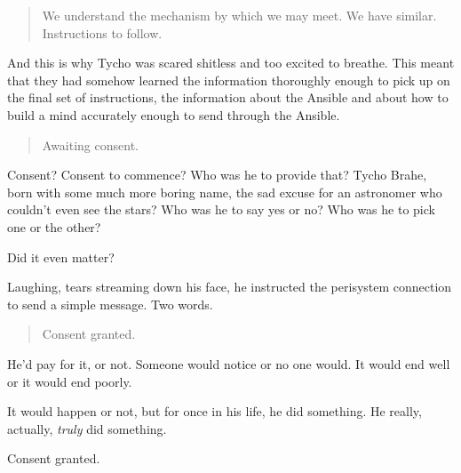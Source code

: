 \begin{quote}
We understand the mechanism by which we may meet. We have similar. Instructions to follow.
\end{quote}

\noindent And this is why Tycho was scared shitless and too excited to breathe. This meant that they had somehow learned the information thoroughly enough to pick up on the final set of instructions, the information about the Ansible and about how to build a mind accurately enough to send through the Ansible.

\begin{quote}
Awaiting consent.
\end{quote}

\noindent Consent? Consent to commence? Who was he to provide that? Tycho Brahe, born with some much more boring name, the sad excuse for an astronomer who couldn't even see the stars? Who was he to say yes or no? Who was he to pick one or the other?

Did it even matter?

Laughing, tears streaming down his face, he instructed the perisystem connection to send a simple message. Two words.

\begin{quote}
Consent granted.
\end{quote}

\noindent He'd pay for it, or not. Someone would notice or no one would. It would end well or it would end poorly.

It would happen or not, but for once in his life, he did something. He really, actually, \emph{truly} did something.

Consent granted.
